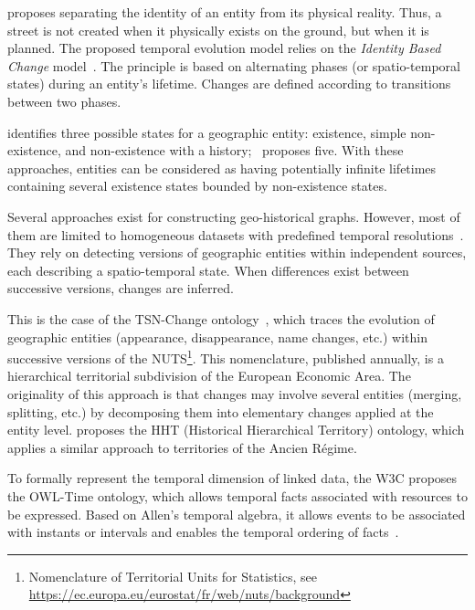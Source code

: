 \cite{hallot_identite_2012} proposes separating the identity of an entity from its physical reality.
Thus, a street is not created when it physically exists on the ground, but when it is planned.
The proposed temporal evolution model relies on the \textit{Identity Based Change} model~\cite{hornsby_identity-based_2000}.
The principle is based on alternating phases (or spatio-temporal states) during an entity's lifetime.
Changes are defined according to transitions between two phases.

\cite{hornsby_identity-based_2000} identifies three possible states for a geographic entity: existence, simple non-existence, and non-existence with a history;~\cite{hallot_identite_2012} proposes five.
With these approaches, entities can be considered as having potentially infinite lifetimes containing several existence states bounded by non-existence states.

Several approaches exist for constructing geo-historical graphs.
However, most of them are limited to homogeneous datasets with predefined temporal resolutions~\cite{armstrong_temporality_1988,dumenieu_systeme_2015,costes_vers_2016,bernard_ontologies_2018}.
They rely on detecting versions of geographic entities within independent sources, each describing a spatio-temporal state.
When differences exist between successive versions, changes are inferred.

This is the case of the TSN-Change ontology~\cite{bernard_ontologies_2018}, which traces the evolution of geographic entities (appearance, disappearance, name changes, etc.) within successive versions of the NUTS\footnote{Nomenclature of Territorial Units for Statistics, see \url{https://ec.europa.eu/eurostat/fr/web/nuts/background}}.
This nomenclature, published annually, is a hierarchical territorial subdivision of the European Economic Area.
The originality of this approach is that changes may involve several entities (merging, splitting, etc.) by decomposing them into elementary changes applied at the entity level.
\cite{bourel_graphes_2022} proposes the HHT (Historical Hierarchical Territory) ontology, which applies a similar approach to territories of the Ancien Régime.

To formally represent the temporal dimension of linked data, the W3C proposes the OWL-Time ontology, which allows temporal facts associated with resources to be expressed.
Based on Allen's temporal algebra, it allows events to be associated with instants or intervals and enables the temporal ordering of facts~\cite{pan_time_2006}.